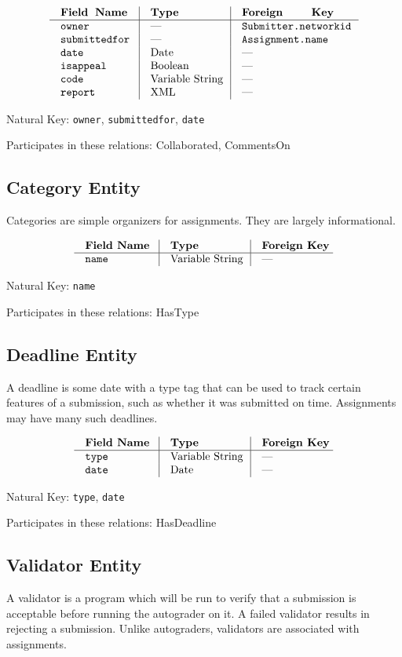 $$\vbox{
	\offinterlineskip
	\halign{
		\strut \quad {\tt #}	& \vrule\quad #	& \vrule\quad # \cr
		{\bf Field Name}	& {\bf Type}	& {\bf Foreign Key}\cr
		\noalign{\hrule}		
		owner	& ---	& {\tt Submitter.networkid} \cr
		submittedfor	& ---	& {\tt Assignment.name} \cr
		date	& Date	& --- \cr
		isappeal	& Boolean	& --- \cr
		code	& Variable String	& --- \cr
		report	& XML	& --- \cr
	}
}$$

{\noindent
Natural Key: {\tt owner}, {\tt submittedfor}, {\tt date}\par\noindent
Participates in these relations: Collaborated, CommentsOn \par}

\subsection{Category Entity}
Categories are simple organizers for assignments. 
They are largely informational.

$$\vbox{
	\offinterlineskip
	\halign{
		\strut \quad {\tt #}	& \vrule\quad #	& \vrule\quad # \cr
		{\bf Field Name}	& {\bf Type}	& {\bf Foreign Key}\cr
		\noalign{\hrule}		
		name	& Variable String	& --- \cr
	}
}$$

{\noindent
Natural Key: {\tt name}\par\noindent
Participates in these relations: HasType \par}

\subsection{Deadline Entity}
A deadline is some date with a type tag that can be used to track certain
features of a submission, such as whether it was submitted on time.
Assignments may have many such deadlines.

$$\vbox{
	\offinterlineskip
	\halign{
		\strut \quad {\tt #}	& \vrule\quad #	& \vrule\quad # \cr
		{\bf Field Name}	& {\bf Type}	& {\bf Foreign Key}\cr
		\noalign{\hrule}		
		type	& Variable String	& --- \cr
		date	& Date	& --- \cr
	}
}$$

{\noindent
Natural Key: {\tt type}, {\tt date}\par\noindent
Participates in these relations: HasDeadline \par}

\subsection{Validator Entity}
A validator is a program which will be run to verify that a submission 
is acceptable before running the autograder on it.
A failed validator results in rejecting a submission.
Unlike autograders, validators are associated with assignments.

